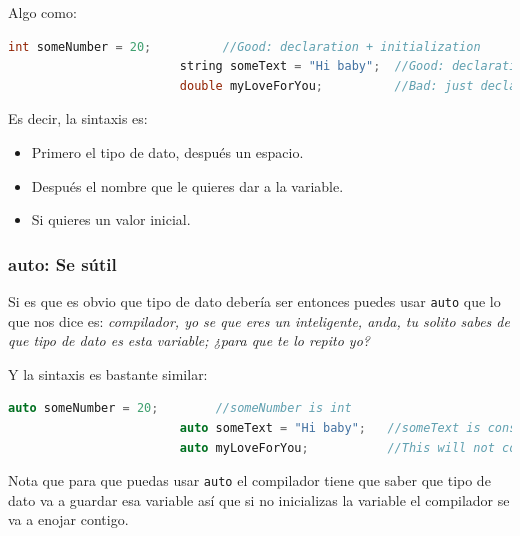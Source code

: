 \documentclass[12pt, fleqn]{report}                             %
\theoremstyle{break}                                            %
\newcommand{\textCode}[1]  { \texttt{#1} }                      %
\begin{document}
                    Algo como:
                    \begin{lstlisting}[language=C++, gobble=24]
                        int someNumber = 20;          //Good: declaration + initialization
                        string someText = "Hi baby";  //Good: declaration + initialization
                        double myLoveForYou;          //Bad: just declaration
                    \end{lstlisting}

                    Es decir, la sintaxis es:
                    \begin{itemize}
                        \item Primero el tipo de dato, después un espacio.
                        \item Después el nombre que le quieres dar a la variable.
                        \item Si quieres un valor inicial.
                    \end{itemize} 

                \subsubsection{auto: Se sútil}

                    Si es que es obvio que tipo de dato debería ser entonces puedes usar \textCode{auto}
                    que lo que nos dice es: \textit{compilador, yo se que eres un inteligente, anda, 
                    tu solito sabes de que tipo de dato es esta variable; ¿para que te lo repito yo?}
                    
                    Y la sintaxis es bastante similar:
                    \begin{lstlisting}[language=C++, gobble=24]
                        auto someNumber = 20;        //someNumber is int
                        auto someText = "Hi baby";   //someText is const char* (this is sad)
                        auto myLoveForYou;           //This will not compile :v
                    \end{lstlisting}

                    Nota que para que puedas usar \textCode{auto} el compilador tiene que saber que tipo
                    de dato va a guardar esa variable así que si no inicializas la variable 
                    el compilador se va a enojar contigo.
\end{document}
